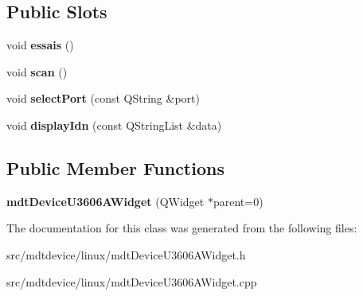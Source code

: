 \subsection*{Public Slots}
\begin{DoxyCompactItemize}
\item 
\hypertarget{classmdt_device_u3606_a_widget_aa232cf25e8ac0dee00cde5089af623b0}{
void {\bfseries essais} ()}
\label{classmdt_device_u3606_a_widget_aa232cf25e8ac0dee00cde5089af623b0}

\item 
\hypertarget{classmdt_device_u3606_a_widget_abc2b2860e71a9c79af6697205ead2a84}{
void {\bfseries scan} ()}
\label{classmdt_device_u3606_a_widget_abc2b2860e71a9c79af6697205ead2a84}

\item 
\hypertarget{classmdt_device_u3606_a_widget_a15409aed9aa73929b64be63db9f31f8e}{
void {\bfseries selectPort} (const QString \&port)}
\label{classmdt_device_u3606_a_widget_a15409aed9aa73929b64be63db9f31f8e}

\item 
\hypertarget{classmdt_device_u3606_a_widget_a3e979d85d5e198a97b36b4956d06ce8e}{
void {\bfseries displayIdn} (const QStringList \&data)}
\label{classmdt_device_u3606_a_widget_a3e979d85d5e198a97b36b4956d06ce8e}

\end{DoxyCompactItemize}
\subsection*{Public Member Functions}
\begin{DoxyCompactItemize}
\item 
\hypertarget{classmdt_device_u3606_a_widget_a653d85749d67555d8c3a43a779b6d2a2}{
{\bfseries mdtDeviceU3606AWidget} (QWidget $\ast$parent=0)}
\label{classmdt_device_u3606_a_widget_a653d85749d67555d8c3a43a779b6d2a2}

\end{DoxyCompactItemize}


The documentation for this class was generated from the following files:\begin{DoxyCompactItemize}
\item 
src/mdtdevice/linux/mdtDeviceU3606AWidget.h\item 
src/mdtdevice/linux/mdtDeviceU3606AWidget.cpp\end{DoxyCompactItemize}
